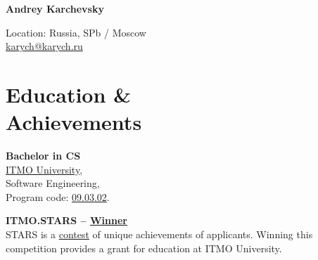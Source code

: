 \documentclass[a4paper,10pt]{article}
\newcommand{\MySkip}{
\vskip12pt
}
\newcommand{\myhref}[2]{%
\href{#1}{\textcolor{ColorTwo}{#2}}
}
\begin{document}
\thispagestyle{empty}

\begin{adjustbox}{valign=t}
\begin{minipage}{0.3\textwidth}

\begin{center}

\MySkip

{\LARGE \bfseries Andrey Karchevsky}

\MySkip

Location: Russia, SPb / Moscow \\

\textcolor{ColorTwo}{\faEnvelopeO} 
\myhref{mailto:karych@karych.ru}{karych@karych.ru}

\end{center}

\section*{Education \& \\ Achievements}
\begin{description}
    \raggedright
	\item [\normalfont \textcolor{ColorOne}{2023-2027}] \textbf{Bachelor in CS}\\ 
	\href{https://itmo.ru/}{ITMO University}, \\ Software Engineering, \\ Program code: \href{https://fitp.itmo.ru/p/about-fitp/753}{09.03.02}. \\
        \item [\normalfont \textcolor{ColorOne}{2023}] \textbf{ITMO.STARS -- \myhref{https://news.itmo.ru/en/education/students/news/13345/}{Winner}}\\ 
        STARS is a \href{https://stars.itmo.ru/}{contest} of unique achievements of applicants. Winning this competition provides a grant for education at ITMO University.
\\
 

\end{description}
\end{minipage}
\end{adjustbox}
\end{document}
